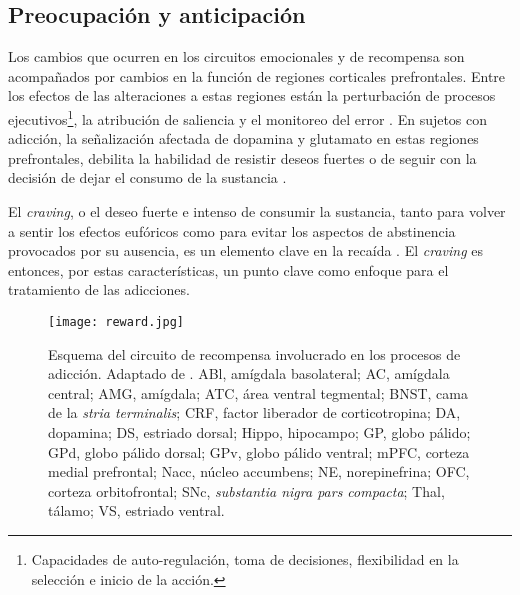 \subsection{Preocupación y anticipación}
\label{crav}
Los cambios que ocurren en los circuitos emocionales y de recompensa son acompañados por cambios en la función de regiones corticales prefrontales.
Entre los efectos de las alteraciones a estas regiones están la perturbación de procesos ejecutivos\footnote{Capacidades de auto-regulación, toma de decisiones, flexibilidad en la selección e inicio de la acción.}, la atribución de saliencia y el monitoreo del error \parencite{Goldstein2012a,Volkow2016}.
En sujetos con adicción, la señalización afectada de dopamina y glutamato en estas regiones prefrontales, debilita la habilidad de resistir deseos fuertes o de seguir con la decisión de dejar el consumo de la sustancia \parencite{Volkow2016}.\par
El \textit{craving}, o el deseo fuerte e intenso de consumir la sustancia, tanto para volver a sentir los efectos eufóricos como para evitar los aspectos de abstinencia provocados por su ausencia, es un elemento clave en la recaída \parencite{Koob2010a}.
El \textit{craving} es entonces, por estas características, un punto clave como enfoque para el tratamiento de las adicciones.

\begin{figure}[!ht]
    \centering
    \texttt{[image: reward.jpg]}
    \caption{Esquema del circuito de recompensa involucrado en los procesos de adicción. Adaptado de \textcite{Koob2010a}. ABl, amígdala basolateral; AC, amígdala central; AMG, amígdala; ATC, área ventral tegmental; BNST, cama de la \textit{stria terminalis}; CRF, factor liberador de corticotropina; DA, dopamina; DS, estriado dorsal; Hippo, hipocampo; GP, globo pálido; GPd, globo pálido dorsal; GPv, globo pálido ventral; mPFC, corteza medial prefrontal; Nacc, núcleo accumbens; NE, norepinefrina; OFC, corteza orbitofrontal; SNc, \textit{substantia nigra pars compacta}; Thal, tálamo; VS, estriado ventral.}
    \label{fig:rew}
\end{figure}

